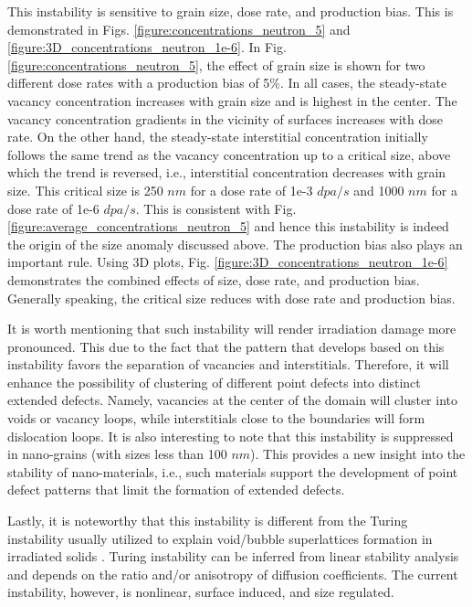 \documentclass[utf8]{frontiersSCNS} %
\begin{document}
    This instability is sensitive to grain size, dose rate, and production bias. This is demonstrated in Figs. \ref{figure:concentrations_neutron_5} and \ref{figure:3D_concentrations_neutron_1e-6}. In Fig. \ref{figure:concentrations_neutron_5}, the effect of grain size is shown for two different dose rates with a production bias of 5\%. In all cases, the steady-state vacancy concentration increases with grain size and is highest in the center. The vacancy concentration gradients in the vicinity of surfaces increases with dose rate. On the other hand, the steady-state interstitial concentration initially follows the same trend as the vacancy concentration up to a critical size, above which the trend is reversed, i.e., interstitial concentration decreases with grain size. This critical size is 250 $nm$ for a dose rate of 1e-3 $dpa/s$ and 1000 $nm$ for a dose rate of 1e-6 $dpa/s$. This is consistent with Fig. \ref{figure:average_concentrations_neutron_5} and hence this instability is indeed the origin of the size anomaly discussed above. The production bias also plays an important rule. Using 3D plots, Fig. \ref{figure:3D_concentrations_neutron_1e-6} demonstrates the combined effects of size, dose rate, and production bias. Generally speaking, the critical size reduces with dose rate and production bias.
    
    It is worth mentioning that such instability will render irradiation damage more pronounced. This due to the fact that the pattern that develops based on this instability favors the separation of vacancies and interstitials. Therefore, it will enhance the possibility of clustering of different point defects into distinct extended defects. Namely, vacancies at the center of the domain will cluster into voids or vacancy loops, while interstitials close to the boundaries will form dislocation loops. It is also interesting to note that this instability is suppressed in nano-grains (with sizes less than 100 $nm$). This provides a new insight into the stability of nano-materials, i.e., such materials support the development of point defect patterns that limit the formation of extended defects.
    
    Lastly, it is noteworthy that this instability is different from the Turing instability usually utilized to explain void/bubble superlattices formation in irradiated solids \citep{noble2020,ghoniem2001,krishnanOct1980,gao2018}. Turing instability can be inferred from linear stability analysis and depends on the ratio and/or anisotropy of diffusion coefficients. The current instability, however, is nonlinear, surface induced, and size regulated.\\
\end{document}
